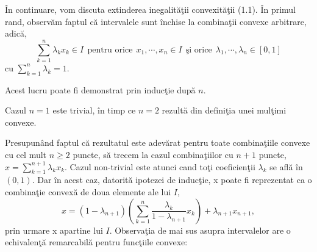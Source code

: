 \documentclass[a4paper,12pt,oneside]{report}
\begin{document}
\^{I}n continuare, vom discuta extinderea inegalit\u{a}\c{t}ii convexit\u{a}\c{t}ii (1.1). \^{I}n primul rand, observ\u{a}m faptul c\u{a} intervalele sunt \^{i}nchise la combina\c{t}ii convexe arbitrare, adic\u{a},
\begin{displaymath}
  \sum_{ k= 1}^{n}\lambda _{k}x_{k} \in I~~\mbox{pentru orice}~~x_{1},\cdots, x_{n} \in I  ~~\mbox{\c{s}i orice}~~\lambda _{1},\cdots, \lambda _{n} \in \left [ 0 , 1  \right ]
\end{displaymath}
 cu \(\sum_{k = 1}^{n} \lambda _{k} = 1\).

 Acest lucru poate fi demonstrat prin induc\c{t}ie dup\u{a} \(n\).

 Cazul \(n=1\) este trivial, \^{i}n timp ce \(n = 2\) rezult\u{a} din defini\c{t}ia unei mul\c{t}imi convexe.

  Presupun\^{a}nd faptul c\u{a} rezultatul este adev\u{a}rat pentru toate combina\c{t}iile convexe cu cel mult \(n\geq 2\) puncte, s\u{a} trecem la cazul combina\c{t}iilor cu \(n + 1\) puncte, \(x = \sum_{k = 1}^{n + 1} \lambda _{k}x_{k}\). Cazul non-trivial este atunci cand to\c{t}i coeficien\c{t}ii \(\lambda _{k}\) se afl\u{a} \^{i}n \(\left ( 0 , 1 \right )\). Dar \^{i}n acest caz, datorit\u{a} ipotezei de induc\c{t}ie, x poate fi reprezentat ca o combina\c{t}ie convex\u{a} de doua elemente ale lui \(I\),
\begin{displaymath}
  x = \left ( 1 - \lambda _{n + 1} \right )\left ( \sum_{k = 1}^{n} \frac{\lambda _{k}}{1 - \lambda _{n + 1}} x_{k}\right ) + \lambda _{n + 1}x_{n + 1},
\end{displaymath}
prin urmare x apartine lui \(I\).
	Observa\c{t}ia de mai sus asupra intervalelor are o echivalen\c{t}\u{a} remarcabil\u{a} pentru func\c{t}iile convexe:
\end{document}
